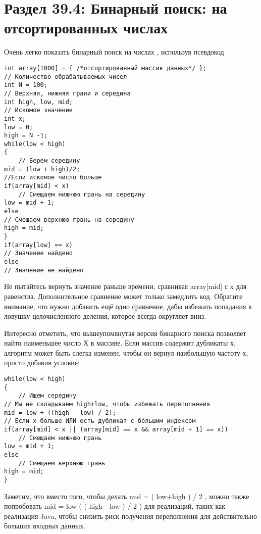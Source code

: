 \newpage

\section*{Раздел 39.4: Бинарный поиск: на отсортированных числах}

\vspace{\baselineskip}
Очень легко показать бинарный поиск на числах , используя псевдокод

\vspace{\baselineskip}
\begin{verbatim} 
int array[1000] = { /*отсортированный массив данных*/ };
// Количество обрабатываемых чисел
int N = 100;
// Верхняя, нижняя грани и середина
int high, low, mid; 
// Искомое значение
int x;
low = 0;
high = N -1;
while(low < high)
{	
	// Берем середину
mid = (low + high)/2;
//Если искомое число больше
if(array[mid] < x)
	// Смещаем нижнюю грань на середину
low = mid + 1;
else
// Смещаем верхнюю грань на середину
high = mid;
}
if(array[low] == x)
// Значение найдено
else
// Значение не найдено
\end{verbatim}

\vspace{\baselineskip}
Не пытайтесь вернуть значение раньше времени, сравнивая array[mid] с x для равенства. Дополнительное сравнение может только замедлить код. Обратите внимание, что нужно добавить ещё одно сравнение, дабы избежать попадания в ловушку целочисленного деления, которое всегда округляет вниз.

\vspace{\baselineskip}
Интересно отметить, что вышеупомянутая версия бинарного поиска позволяет найти наименьшее число Х в массиве. Если массив содержит дубликаты х, алгоритм может быть слегка изменен, чтобы он вернул наибольшую частоту х, просто добавив условие:

\vspace{\baselineskip}
\begin{verbatim} 
while(low < high)
{
	// Ищем середину
// Мы не складываем high+low, чтобы избежать переполнения
mid = low + ((high - low) / 2);
// Если x больше ИЛИ есть дубликат с бóльшим индексом
if(array[mid] < x || (array[mid] == x && array[mid + 1] == x))
	// Смещаем нижнюю грань
low = mid + 1;
else
	// Смещаем верхнюю грань
high = mid;
}
\end{verbatim}

\vspace{\baselineskip}
Заметим, что вместо того, чтобы делать mid = ( low+high ) / 2 , можно также  попробовать mid = low ( ( high - low ) / 2 ) для реализаций, таких как реализация Java, чтобы снизить риск получения переполнения для действительно больших входных данных.

